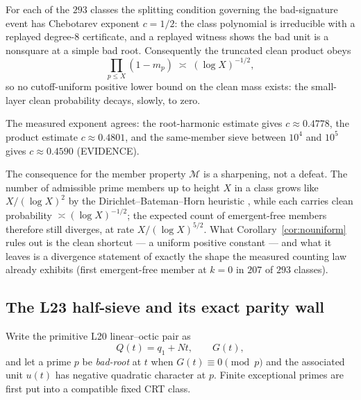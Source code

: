 \begin{corollary}
\label{cor:nouniform}
For each of the $293$ classes the splitting condition governing the
bad-signature event has Chebotarev exponent $c = 1/2$: the class
polynomial is irreducible with a replayed degree-$8$ certificate, and a
replayed witness shows the bad unit is a nonsquare at a simple bad
root. Consequently the truncated clean product obeys
\[
   \prod_{p \le X} (1 - m_p) \;\asymp\; (\log X)^{-1/2},
\]
so no cutoff-uniform positive lower bound on the clean mass exists:
the small-layer clean probability decays, slowly, to zero.
\end{corollary}

The measured exponent agrees: the root-harmonic estimate gives
$c \approx 0.4778$, the product estimate $c \approx 0.4801$, and the
same-member sieve between $10^4$ and $10^5$ gives $c \approx 0.4590$
(EVIDENCE).

The consequence for the member property $\mathcal M$ is a sharpening, not a defeat. The
number of admissible prime members up to height $X$ in a class grows
like $X/(\log X)^{2}$ by the Dirichlet--Bateman--Horn heuristic
\cite{batemanhorn}, while
each carries clean probability $\asymp (\log X)^{-1/2}$; the expected
count of emergent-free members therefore still diverges, at rate
$X/(\log X)^{5/2}$. What Corollary~\ref{cor:nouniform} rules out is the
clean shortcut --- a uniform positive constant --- and what it leaves is
a divergence statement of exactly the shape the measured counting law
already exhibits (first emergent-free member at $k=0$ in $207$ of $293$
classes).

\subsection{The L23 half-sieve and its exact parity wall}

Write the primitive L20 linear--octic pair as
\[
 Q(t)=q_1+Nt,\qquad G(t),
\]
and let a prime \(p\) be \emph{bad-root} at \(t\) when
\(G(t)\equiv0\pmod p\) and the associated unit \(u(t)\) has negative
quadratic character at \(p\).  Finite exceptional primes are first put
into a compatible fixed CRT class.

